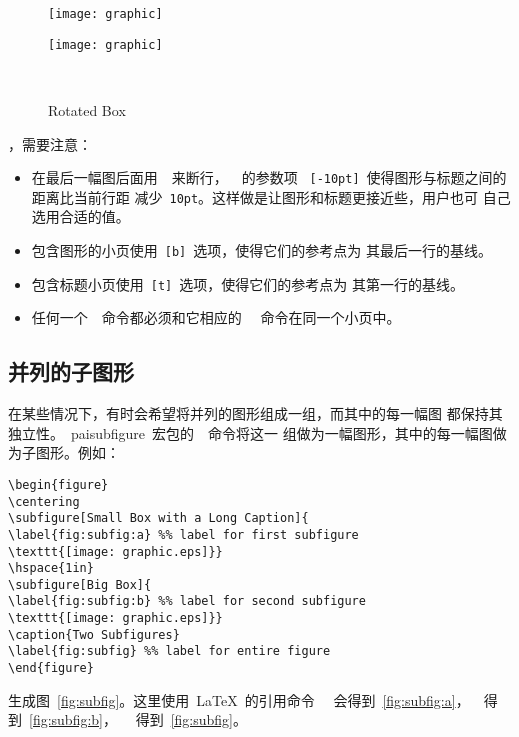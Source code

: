 \begin{figure}
	\centering
	\begin{minipage}[b]{.33\textwidth}
		\centering
		\texttt{[image: graphic]}
	\end{minipage}%
	\begin{minipage}[b]{.33\textwidth}\label{fig:mininonrot:a}
		\centering
		\texttt{[image: graphic]}
	\end{minipage}\\[-10pt]
	\begin{minipage}[t]{.33\textwidth}
		\caption{Box with a Long Caption}
	\end{minipage}%
	\begin{minipage}[t]{.33\textwidth}
		\caption{Rotated Box}\label{fig:minirot:a}
	\end{minipage}%
\end{figure}

，需要注意：
\begin{itemize}
	\item 在最后一幅图后面用~\cmd{\bs}~来断行，~\cmd{\bs}~的参数项
	~\texttt{[-10pt]}~使得图形与标题之间的距离比当前行距
	减少~\texttt{10pt}。这样做是让图形和标题更接近些，用户也可
	自己选用合适的值。
	\item 包含图形的小页使用~\texttt{[b]}~选项，使得它们的参考点为
	其最后一行的基线。
	\item 包含标题小页使用~\texttt{[t]}~选项，使得它们的参考点为
	其第一行的基线。
	\item 任何一个~~命令都必须和它相应的~~
	命令在同一个小页中。
\end{itemize}

\subsection{并列的子图形}\label{ssec:sidesubfigure}

在某些情况下，有时会希望将并列的图形组成一组，而其中的每一幅图
都保持其独立性。~pai{subfigure}~宏包的~~命令将这一
组做为一幅图形，其中的每一幅图做为子图形。例如：
\begin{Verbatim}[xleftmargin=1cm]
\begin{figure} 
\centering 
\subfigure[Small Box with a Long Caption]{ 
\label{fig:subfig:a} %% label for first subfigure 
\texttt{[image: graphic.eps]}} 
\hspace{1in} 
\subfigure[Big Box]{ 
\label{fig:subfig:b} %% label for second subfigure 
\texttt{[image: graphic.eps]}} 
\caption{Two Subfigures} 
\label{fig:subfig} %% label for entire figure 
\end{figure}
\end{Verbatim}
生成图~\ref{fig:subfig}。这里使用~\LaTeX{}~的引用命令~~
会得到~\ref{fig:subfig:a}，~~得到~\ref{fig:subfig:b}，
~~得到~\ref{fig:subfig}。

